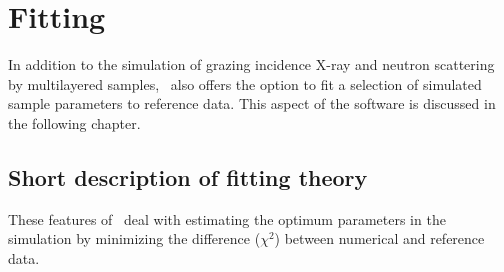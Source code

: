 \newpage
\chapter{Fitting} \label{Fittingchap}


In addition to the simulation of grazing incidence
X-ray and neutron scattering by
multilayered samples, \BornAgain\ also offers the option to
fit a selection of simulated sample parameters to reference data.  This aspect
of the software is discussed in the following chapter.

\section{Short description of fitting theory}


These features of \BornAgain\ deal with estimating the optimum parameters
in the simulation by minimizing the difference ($\chi^2$) between
numerical and reference data.\\


